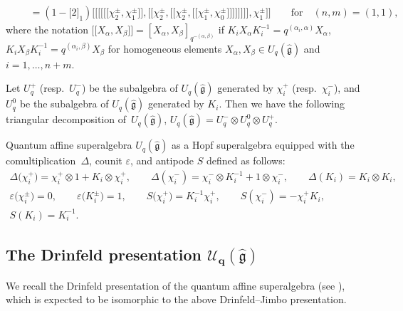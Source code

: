 \documentclass[pdftex]{sigma}
\numberwithin{equation}{section}
\begin{document}
\begin{Definition}
\begin{gather*}
\qquad =(1-\bigl[2\bigr]_1)\bigl[\!\!\bigl[ \bigl[\!\!\bigl[ \bigl[\!\!\bigl[\chi_2^{\pm}, \chi_1^{\pm}\bigr]\!\!\bigr], \bigl[\!\!\bigl[\chi_2^{\pm}, \bigl[\!\!\bigl[\chi_2^{\pm}, \bigl[\!\!\bigl[\chi_1^{\pm}, \chi_0^{\pm}\bigr]\!\!\bigr] \bigr]\!\!\bigr] \bigr]\!\!\bigr] \bigr]\!\!\bigr], \chi_1^{\pm}\bigr]\!\!\bigr]\qquad\textrm{for}\quad (n,m)=(1,1),
\end{gather*}
where the notation $\bigl[\!\!\bigl[X_{\alpha}, X_{\beta}\bigr]\!\!\bigr]=[X_{\alpha}, X_{\beta}]_{q^{-(\alpha,\beta)}}$ if $K_iX_{\alpha}K_i^{-1}=q^{(\alpha_i,\alpha)}X_{\alpha}$, $K_iX_{\beta}K_i^{-1}=q^{(\alpha_i,\beta)}X_{\beta}$ for homogeneous elements $X_{\alpha},X_{\beta}\in U_q(\mathfrak{\hat{g}})$ and $i=1,\ldots,n+m$.
\end{Definition}

Let $U_q^{+}$ (resp.\ $U_q^{-}$) be the subalgebra of $U_q(\mathfrak{\hat{g}})$ generated by $\chi_i^{+}$ (resp.\ $\chi_i^{-}$), and $U_q^{0}$ be the subalgebra of $U_q(\mathfrak{\hat{g}})$ generated by $K_i$. Then we have the following triangular decomposition of~$U_q(\mathfrak{\hat{g}})$,
$U_q(\mathfrak{\hat{g}})=U_q^{-}\otimes U_q^{0}\otimes U_q^{+}$.

Quantum affine superalgebra $U_q(\mathfrak{\hat{g}})$
as a
Hopf superalgebra equipped with the comultiplication~$\Delta$, counit $\varepsilon$, and antipode $S$ defined as follows:
\begin{gather*}
 \Delta\bigl(\chi_i^{+}\bigr) = \chi_i^{+}\otimes 1 + K_i\otimes\chi_i^{+},\qquad
 \Delta(\chi_i^{-}) = \chi_i^{-}\otimes K_i^{-1} + 1\otimes\chi_i^{-}, \qquad
 \Delta(K_i) = K_i\otimes K_i,\\ \varepsilon\bigl(\chi_i^{\pm}\bigr) = 0,\qquad \varepsilon\bigl(K_i^{\pm}\bigr) = 1,\qquad
 S\bigl(\chi_i^{+}\bigr) = K_i^{-1}\chi_i^{+},\qquad S(\chi_i^{-}) = -\chi_i^{+}K_i, \\ S(K_i) = K_i^{-1}.
\end{gather*}

\subsection[The Drinfeld presentation U\_q(g)]{The Drinfeld presentation $\boldsymbol{\mathcal{U}_q(\mathfrak{\hat{g}})}$ }

We recall the Drinfeld presentation of the quantum affine superalgebra (see \cite{Bezerra, XWLHZ,HYAM}), which is expected to be isomorphic to the above Drinfeld--Jimbo presentation.
\end{document}
